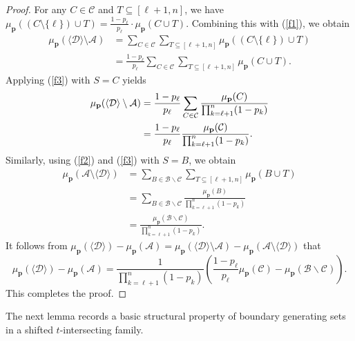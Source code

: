 \documentclass[11pt]{article}
\begin{document}
\begin{proof}
For any $C \in \mathcal{C}$ and  $T \subseteq [\ell+1,n]$, we have
$
\mu_{\mathbf{p}}((C \setminus \{\ell\}) \cup T)
=
\frac{1-p_\ell}{p_\ell} \cdot \mu_{\mathbf{p}}(C \cup T). 
$
Combining this with (\ref{f1}), we obtain
\begin{align*}
\mu_{\mathbf{p}}(\langle \mathcal{D} \rangle \setminus \mathcal{A})
&=
\sum_{C \in \mathcal{C}} \sum_{T \subseteq [\ell+1,n]} 
\mu_{\mathbf{p}}((C \setminus \{\ell\}) \cup T) \\
&=
\frac{1-p_\ell}{p_\ell} 
\sum_{C \in \mathcal{C}} \sum_{T \subseteq [\ell+1,n]} 
\mu_{\mathbf{p}}(C \cup T).
\end{align*}
Applying (\ref{f3}) with $S = C$ yields
\begin{align*}
\mu_{\mathbf{p}}(\langle \mathcal{D} \rangle \setminus \mathcal{A})
&=
\frac{1-p_\ell}{p_\ell}
\sum_{C \in \mathcal{C}} 
\frac{\mu_{\mathbf{p}}(C)}{\prod_{k=\ell+1}^n (1-p_k)} \notag\\
&=
\frac{1-p_\ell}{p_\ell}
\frac{\mu_{\mathbf{p}}( \mathcal{C} )}{\prod_{k=\ell+1}^n (1-p_k)}.
\end{align*}
Similarly, using   (\ref{f2}) and (\ref{f3})  with $S = B$, we obtain
\begin{align*}
\mu_{\mathbf{p}}(\mathcal{A} \setminus \langle \mathcal{D} \rangle)
&=
\sum_{B \in \mathcal{B}\backslash \mathcal{C}} \sum_{T \subseteq [\ell+1,n]} 
\mu_{\mathbf{p}}(B \cup T) \\
&=
\sum_{B \in \mathcal{B}\backslash \mathcal{C}} 
\frac{\mu_{\mathbf{p}}(B)}{\prod_{k=\ell+1}^n (1-p_k)} \\
&=
\frac{\mu_{\mathbf{p}}(\mathcal{B}\backslash \mathcal{C} )}{\prod_{k=\ell+1}^n (1-p_k)}.
\end{align*}
It follows from 
$
\mu_{\mathbf{p}}(\langle \mathcal{D} \rangle) - \mu_{\mathbf{p}}(\mathcal{A})
=
\mu_{\mathbf{p}}(\langle \mathcal{D} \rangle \setminus \mathcal{A}) - \mu_{\mathbf{p}}(\mathcal{A} \setminus \langle \mathcal{D} \rangle)
$
that
$$
\mu_{\mathbf{p}}(\langle \mathcal{D} \rangle) - \mu_{\mathbf{p}}(\mathcal{A})
=
\frac{1}{\prod_{k=\ell+1}^n (1-p_k)} \left(
\frac{1-p_\ell}{p_\ell}  \mu_{\mathbf{p}}( \mathcal{C}) - \mu_{\mathbf{p}}( \mathcal{B}\backslash \mathcal{C})
\right).
$$
This completes the proof. 
\end{proof}






The next lemma records a basic structural property of boundary generating sets in a shifted $t$-intersecting family.
\end{document}
